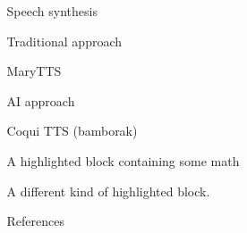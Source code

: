 \documentclass[final]{beamer}
\newlength{\sepwidth}
\newlength{\colwidth}
\newcommand{\separatorcolumn}{\begin{column}{\sepwidth}\end{column}}
\begin{document}
\begin{frame}[t]
\begin{columns}[t]
\begin{column}{\colwidth}
\end{column}

\separatorcolumn

\begin{column}{\colwidth}

  \begin{block}{Speech synthesis}

    Traditional approach

    MaryTTS

    AI approach

    Coqui TTS (bamborak)

  \end{block}
  
  \begin{exampleblock}{A highlighted block containing some math}

    A different kind of highlighted block.

  \end{exampleblock}


  \begin{block}{References}

    \nocite{*}
    \footnotesize{}

  \end{block}

\end{column}

\separatorcolumn
\end{columns}
\end{frame}
\end{document}
